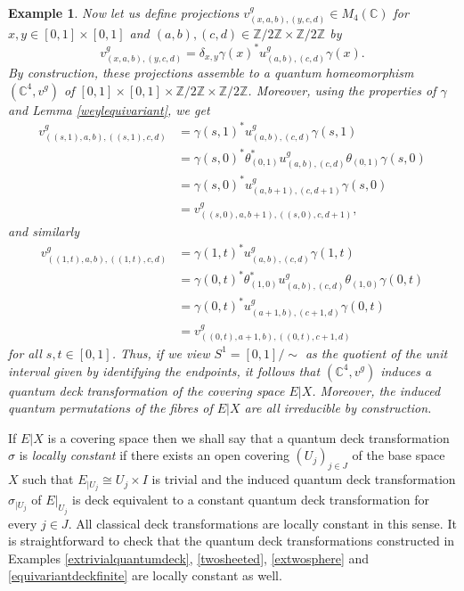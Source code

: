 \documentclass[a4paper]{amsart}
\numberwithin{equation}{section}
\theoremstyle{change}
\newtheorem{example}[theorem]{Example}
\begin{document}
\begin{example}
Now let us define projections $ v^g_{(x,a,b), (y,c,d)} \in M_4(\mathbb{C}) $ for $ x,y \in [0,1] \times [0,1] $ and $ (a,b), (c,d) \in \mathbb{Z}/2\mathbb{Z} \times \mathbb{Z}/2 \mathbb{Z} $ by 
$$
v^g_{(x,a,b), (y,c,d)} = \delta_{x,y} \gamma(x)^* u^g_{(a,b),(c,d)} \gamma(x).
$$
By construction, these projections assemble to a quantum homeomorphism $ (\mathbb{C}^4, v^g) $ of $ [0,1] \times [0,1] \times \mathbb{Z}/2 \mathbb{Z} \times \mathbb{Z}/2 \mathbb{Z} $. 
Moreover, using the properties of $ \gamma $ and Lemma \ref{weylequivariant}, we get 
\begin{align*}
v^g_{((s,1),a,b), ((s,1),c,d)} &= \gamma(s,1)^* u^g_{(a,b),(c,d)} \gamma(s,1) \\
&= \gamma(s,0)^* \theta_{(0,1)}^* u^g_{(a,b),(c,d)} \theta_{(0,1)} \gamma(s,0) \\
&= \gamma(s,0)^* u^g_{(a,b + 1),(c,d + 1)} \gamma(s,0) \\
&= v^g_{((s,0),a,b + 1), ((s,0),c,d + 1)}, 
\end{align*}
and similarly
\begin{align*}
v^g_{((1,t),a,b), ((1,t),c,d)} &= \gamma(1,t)^* u^g_{(a,b),(c,d)} \gamma(1,t) \\
&= \gamma(0,t)^* \theta_{(1,0)}^* u^g_{(a,b),(c,d)} \theta_{(1,0)} \gamma(0,t) \\
&= \gamma(0,t)^* u^g_{(a + 1,b),(c + 1,d)} \gamma(0,t) \\
&= v^g_{((0,t),a + 1,b), ((0,t),c + 1,d)} 
\end{align*}
for all $ s,t \in [0,1] $. 
Thus, if we view $ S^1 = [0,1]/\sim $ as the quotient of the unit interval given by identifying the endpoints, it follows that $ (\mathbb{C}^4, v^g) $ induces a quantum deck transformation of the covering space $ E|X $. Moreover, the induced quantum permutations of the fibres of $ E|X $ are all irreducible by construction. 
\end{example} 

If $ E|X $ is a covering space then we shall say that a quantum deck transformation $ \sigma $ is \emph{locally constant} if there exists an open covering $ (U_j)_{j \in J} $ of the base space $ X $ such that $ E_{|U_j} \cong U_j \times I $ is trivial and the induced quantum deck transformation $ \sigma_{|U_j} $ of $ E|_{U_j} $ is deck equivalent to a constant quantum deck transformation for every $ j \in J $. All classical deck transformations are locally constant in this sense. It is straightforward to check that the quantum deck transformations constructed in Examples \ref{extrivialquantumdeck}, \ref{twosheeted},  \ref{extwosphere} and \ref{equivariantdeckfinite} are locally constant as well. 
\end{document}
